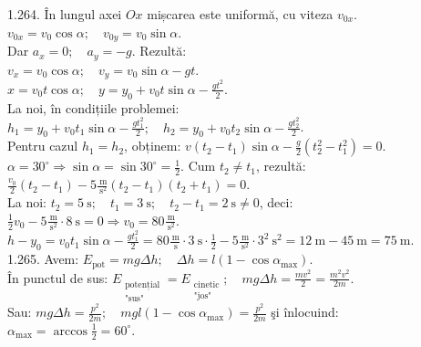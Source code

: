 1.264. În lungul axei $Ox$ mișcarea este uniformă, cu viteza $v_{0 x}$.\\ $v_{0 x}=v_{0} \cos \alpha; \quad v_{0 y}=v_{0} \sin \alpha$.\\ Dar $a_{x}=0; \quad a_{y}=-g$. Rezultă:\\ $v_{x}=v_{0} \cos \alpha; \quad v_{y}=v_{0} \sin \alpha-g t$.\\ $x=v_{0} t \cos \alpha; \quad y=y_{0}+v_{0} t \sin \alpha-\frac{g t^{2}}{2}$.\\ La noi, în condițiile problemei:\\ $h_{1}=y_{0}+v_{0} t_{1} \sin \alpha-\frac{g t_{1}^{2}}{2}; \quad h_{2}=y_{0}+v_{0} t_{2} \sin \alpha-\frac{g t_{2}^{2}}{2}$.\\ Pentru cazul $h_{1}=h_{2}$, obținem: $v\left(t_{2}-t_{1}\right) \sin \alpha-\frac{g}{2}\left(t_{2}^{2}-t_{1}^{2}\right)=0$.\\ $\alpha=30^{\circ} \Rightarrow \sin \alpha=\sin 30^{\circ}=\frac{1}{2}$. Cum $t_{2} \neq t_{1}$, rezultă:\\ $\frac{v_{0}}{2}\left(t_{2}-t_{1}\right)-5 \frac{\mathrm{~m}}{\mathrm{~s}^{2}}\left(t_{2}-t_{1}\right)\left(t_{2}+t_{1}\right)=0$.\\ La noi: $t_{2}=5 \mathrm{~s}; \quad t_{1}=3 \mathrm{~s}; \quad t_{2}-t_{1}=2 \mathrm{~s} \neq 0$, deci:\\ $\frac{1}{2} v_{0}-5 \frac{\mathrm{~m}}{\mathrm{~s}^{2}} \cdot 8 \mathrm{~s}=0 \Rightarrow v_{0}=80 \frac{\mathrm{~m}}{\mathrm{~s}^{2}}$.\\ $h-y_{0}=v_{0} t_{1} \sin \alpha-\frac{g t_{1}^{2}}{2}=80 \frac{\mathrm{~m}}{\mathrm{~s}} \cdot 3 \mathrm{~s} \cdot \frac{1}{2}-5 \frac{\mathrm{~m}}{\mathrm{~s}^{2}} \cdot 3^{2} \mathrm{~s}^{2}=12 \mathrm{~m}-45 \mathrm{~m}=75 \mathrm{~m}$.\\

1.265. Avem: $E_{\text {pot}}=m g \Delta h; \quad \Delta h=l\left(1-\cos \alpha_{\max}\right)$.\\ În punctul de sus: $E_{\substack{\text {potențial} \\ \text {"sus"}}}=E_{\substack{\text {cinetic} \\ \text {"jos"}}}; \quad m g \Delta h=\frac{m v^{2}}{2}=\frac{m^{2} v^{2}}{2 m}$.\\ Sau: $m g \Delta h=\frac{p^{2}}{2 m}; \quad m g l\left(1-\cos \alpha_{\max}\right)=\frac{p^{2}}{2 m}$ şi înlocuind:\\ $\alpha_{\max }=\arccos \frac{1}{2}=60^{\circ}$.\\

